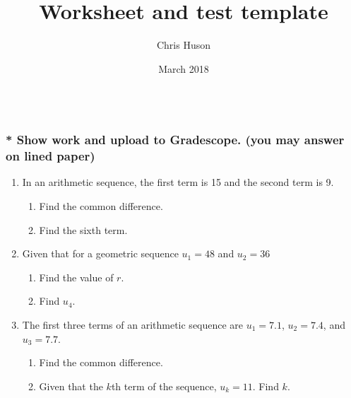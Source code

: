 \documentclass[12pt, oneside]{article}
\title{Worksheet and test template}
\author{Chris Huson}
\date{March 2018}
\begin{document}
\subsubsection*{\\* Show work and upload to Gradescope. (you may answer on lined paper)}

\begin{enumerate}

\vspace{0.5 cm}


\item In an arithmetic sequence, the first term is 15 and the second term is 9.
\begin{enumerate}
    \item Find the common difference. \vspace{2cm}
    \item Find the sixth term.
\end{enumerate} \vspace{2cm}

\item Given that for a geometric sequence $u_1=48$ and $u_2=36$
\begin{enumerate}
    \item Find the value of $r$. \vspace{2cm}
    \item Find $u_4$. 
\end{enumerate} \vspace{2cm}

\item The first three terms of an arithmetic sequence are $u_1=7.1$, $u_2=7.4$, and $u_3=7.7$.
\begin{enumerate}
    \item Find the common difference. \vspace{2cm}
    \item Given that the $k$th term of the sequence, $u_k=11$. Find $k$.
\end{enumerate}



\end{enumerate}
\end{document}
